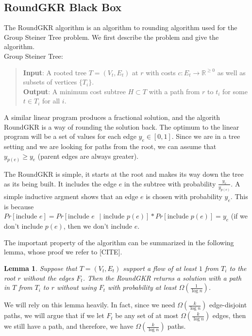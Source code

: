 \documentclass[12pt]{article}
\newtheorem{lemma}{Lemma}
\begin{document}
\subsection{RoundGKR Black Box}

The RoundGKR algorithm is an algorithm to rounding algorithm used for the Group Steiner Tree problem. We first describe the problem and give the algorithm. \\

Group Steiner Tree:
\begin{quote}
\textbf{Input}: A rooted tree $T = (V_t, E_t)$ at $r$ with costs $c: E_t \rightarrow \mathbb{R}^{\geq 0}$ as well as subsets of vertices $\{ T_i \}$. \\
\textbf{Output}: A minimum cost subtree $H \subset T$ with a path from $r$ to $t_i$ for some $t \in T_i$ for all $i$.
\end{quote}

A similar linear program produces a fractional solution, and the algorith RoundGKR is a way of rounding the solution back. The optimum to the linear program will be a set of values for each edge $y_e \in [0, 1]$. Since we are in a tree setting and we are looking for paths from the root, we can assume that $y_{p(e)} \geq y_e$ (parent edges are always greater).

The RoundGKR is simple, it starts at the root and makes its way down the tree as its being built. It includes the edge $e$ in the subtree with probability $\frac{y_e}{y_{p(e)}}$. A simple inductive argment shows that an edge $e$ is chosen with probability $y_e$. This is because $Pr[\text{include $e$}] = Pr[\text{include $e$ $|$ include $p(e)$}]*Pr[\text{include $p(e)$}] = y_e$ (if we don't include $p(e)$, then we don't include $e$. 

The important property of the algorithm can be summarized in the following lemma, whose proof we refer to [CITE].

\begin{lemma}
\label{lem:findpath}
Suppose that $T = (V_t, E_t)$ support a flow of at least $1$ from $T_i$ to the root $r$ without the edges $F_t$. Then the RoundGKR returns a solution with a path in $T$ from $T_i$ to $r$ without using $F_t$ with probability at least $\Omega(\frac{1}{\log n})$. 
\end{lemma}

We will rely on this lemma heavily. In fact, since we need $\Omega(\frac{k}{\log n})$ edge-disjoint paths, we will argue that if we let $F_t$ be any set of at most $\Omega(\frac{k}{\log n})$ edges, then we still have a path, and therefore, we have $\Omega(\frac{k}{\log n})$ paths.  
\end{document}
